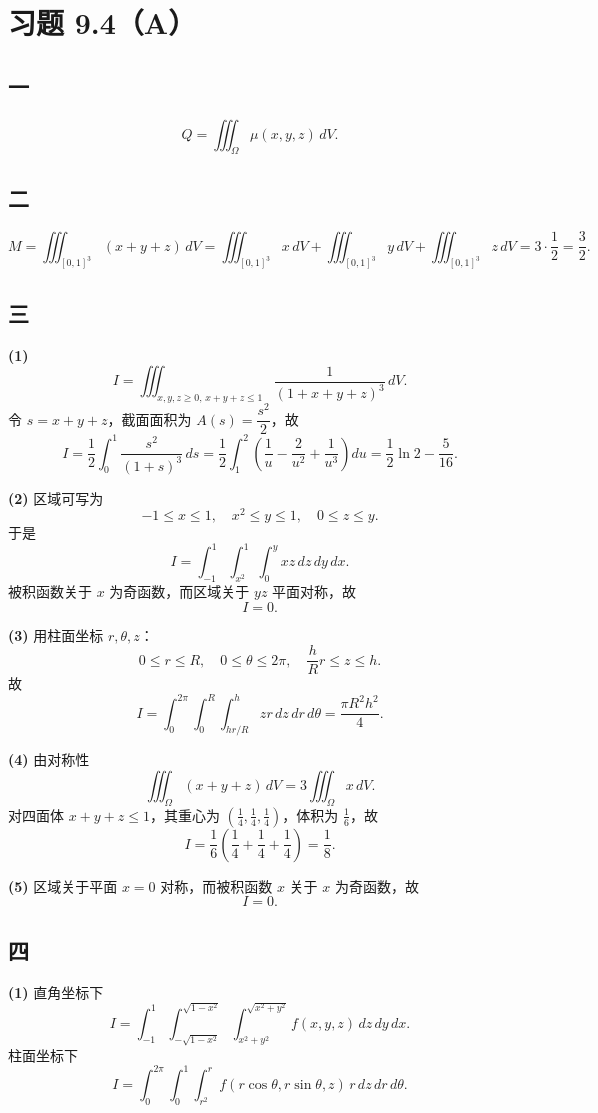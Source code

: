 \documentclass[12pt,a4paper]{ctexart}
\author{}
\date{}
\begin{document}
\section*{习题 9.4（A）}

\subsection*{一}
\[
Q=\iiint_{\Omega} \mu(x,y,z)\,dV.
\]

\subsection*{二}
\[
M=\iiint_{[0,1]^3}(x+y+z)\,dV
=\iiint_{[0,1]^3}x\,dV+\iiint_{[0,1]^3}y\,dV+\iiint_{[0,1]^3}z\,dV
=3\cdot \frac12=\frac32.
\]

\subsection*{三}
\textbf{(1)}
\[
I=\iiint_{x,y,z\ge 0,\,x+y+z\le 1}\frac{1}{(1+x+y+z)^3}\,dV.
\]
令 $s=x+y+z$，截面面积为 $A(s)=\dfrac{s^2}{2}$，故
\[
I=\frac12\int_0^1 \frac{s^2}{(1+s)^3}\,ds
=\frac12\int_1^2\left(\frac1u-\frac{2}{u^2}+\frac1{u^3}\right)du
=\frac12\ln 2-\frac{5}{16}.
\]

\textbf{(2)}
区域可写为
\[
-1\le x\le 1,\quad x^2\le y\le 1,\quad 0\le z\le y.
\]
于是
\[
I=\int_{-1}^1\int_{x^2}^1\int_0^y xz\,dz\,dy\,dx.
\]
被积函数关于 $x$ 为奇函数，而区域关于 $yz$ 平面对称，故
\[
I=0.
\]

\textbf{(3)}
用柱面坐标 $r,\theta,z$：
\[
0\le r\le R,\quad 0\le \theta\le 2\pi,\quad \frac{h}{R}r\le z\le h.
\]
故
\[
I=\int_0^{2\pi}\int_0^R\int_{hr/R}^{h} z r\,dz\,dr\,d\theta
=\frac{\pi R^2h^2}{4}.
\]

\textbf{(4)}
由对称性
\[
\iiint_{\Omega}(x+y+z)\,dV=3\iiint_{\Omega}x\,dV.
\]
对四面体 $x+y+z\le 1$，其重心为 $\left(\frac14,\frac14,\frac14\right)$，体积为 $\frac16$，故
\[
I=\frac16\left(\frac14+\frac14+\frac14\right)=\frac18.
\]

\textbf{(5)}
区域关于平面 $x=0$ 对称，而被积函数 $x$ 关于 $x$ 为奇函数，故
\[
I=0.
\]

\subsection*{四}
\textbf{(1)} 直角坐标下
\[
I=\int_{-1}^1\int_{-\sqrt{1-x^2}}^{\sqrt{1-x^2}}\int_{x^2+y^2}^{\sqrt{x^2+y^2}} f(x,y,z)\,dz\,dy\,dx.
\]
柱面坐标下
\[
I=\int_0^{2\pi}\int_0^1\int_{r^2}^{r} f(r\cos\theta,r\sin\theta,z)\,r\,dz\,dr\,d\theta.
\]
\end{document}
